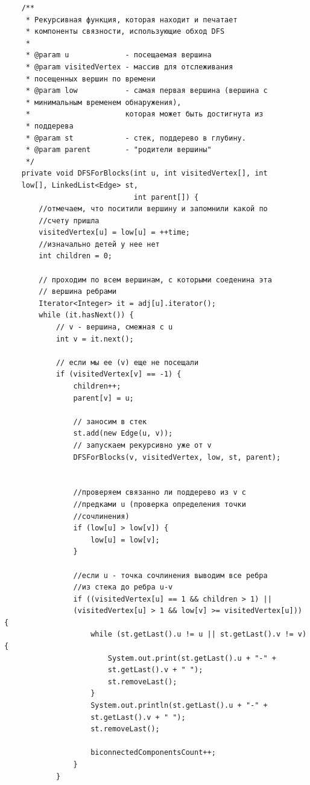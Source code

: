 \documentclass[12pt,a4paper]{scrartcl}
\begin{document}
\begin{verbatim}
    /**
     * Рекурсивная функция, которая находит и печатает
     * компоненты связности, использующие обход DFS
     *
     * @param u             - посещаемая вершина
     * @param visitedVertex - массив для отслеживания
     * посещенных вершин по времени
     * @param low           - самая первая вершина (вершина с
     * минимальным временем обнаружения),
     *                      которая может быть достигнута из
     * поддерева
     * @param st            - стек, поддерево в глубину.
     * @param parent        - "родители вершины"
     */
    private void DFSForBlocks(int u, int visitedVertex[], int
    low[], LinkedList<Edge> st,
                              int parent[]) {
        //отмечаем, что поситили вершину и запомнили какой по
        //счету пришла
        visitedVertex[u] = low[u] = ++time;
        //изначально детей у нее нет
        int children = 0;

        // проходим по всем вершинам, с которыми соеденина эта
        // вершина ребрами
        Iterator<Integer> it = adj[u].iterator();
        while (it.hasNext()) {
            // v - вершина, смежная с u
            int v = it.next();

            // если мы ее (v) еще не посещали
            if (visitedVertex[v] == -1) {
                children++;
                parent[v] = u;

                // заносим в стек
                st.add(new Edge(u, v));
                // запускаем рекурсивно уже от v
                DFSForBlocks(v, visitedVertex, low, st, parent);


                //проверяем связанно ли поддерево из v с
                //предками u (проверка определения точки
                //сочлинения)
                if (low[u] > low[v]) {
                    low[u] = low[v];
                }

                //если u - точка сочлинения выводим все ребра
                //из стека до ребра u-v
                if ((visitedVertex[u] == 1 && children > 1) ||
                (visitedVertex[u] > 1 && low[v] >= visitedVertex[u])) {
                    while (st.getLast().u != u || st.getLast().v != v) {
                        System.out.print(st.getLast().u + "-" +
                        st.getLast().v + " ");
                        st.removeLast();
                    }
                    System.out.println(st.getLast().u + "-" +
                    st.getLast().v + " ");
                    st.removeLast();

                    biconnectedComponentsCount++;
                }
            }


\end{verbatim}
\end{document}
